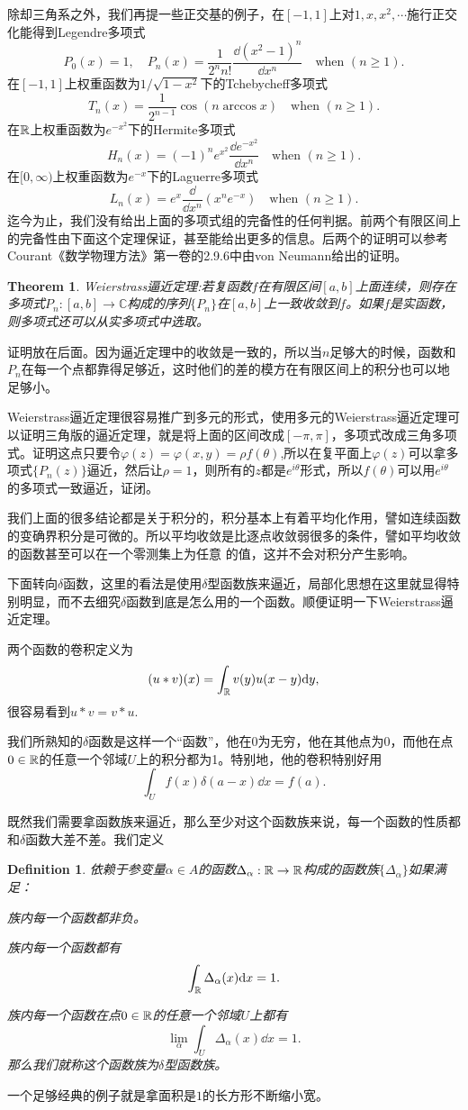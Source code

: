 \documentclass[10pt]{book}
\theoremstyle{plain}%
\newtheorem{defi}{Definition}[chapter]%
\newtheorem{theo}{Theorem}[chapter]%
\newcommand{\cc}{\mathbb{C}}
\begin{document}
除却三角系之外，我们再提一些正交基的例子，在$[-1,1]$上对$1,x,x^2,\cdots$施行正交化能得到Legendre多项式
\[
P_0(x)=1,\quad P_n(x)=\frac{1}{2^n n!}\frac{\dd (x^2-1)^n}{\dd x^n}\quad\text{when} \,\,(n\geq 1).
\]
在$[-1,1]$上权重函数为$1/\sqrt{1-x^2}$下的Tchebycheff多项式
\[
T_n(x)=\frac{1}{2^{n-1}}\cos (n \arccos x)\quad\text{when} \,\,(n\geq 1).
\]
在$\mathbb{R}$上权重函数为$e^{-x^2}$下的Hermite多项式
\[
H_n(x)=(-1)^n e^{x^2} \frac{\dd e^{-x^2}}{\dd x^n}\quad\text{when} \,\,(n\geq 1).
\]
在$[0,\infty)$上权重函数为$e^{-x}$下的Laguerre多项式
\[
L_n(x)=e^{x} \frac{\dd}{\dd x^n}(x^ne^{-x})\quad\text{when} \,\,(n\geq 1).
\]
迄今为止，我们没有给出上面的多项式组的完备性的任何判据。前两个有限区间上的完备性由下面这个定理保证，甚至能给出更多的信息。后两个的证明可以参考Courant《数学物理方法》第一卷的2.9.6中由von Neumann给出的证明。
\begin{theo}
Weierstrass逼近定理:若复函数$f$在有限区间$[a,b]$上面连续，则存在多项式$P_n:[a,b]\to \cc$构成的序列$\{P_n\}$在$[a,b]$上一致收敛到$f$。如果$f$是实函数，则多项式还可以从实多项式中选取。
\end{theo}
证明放在后面。因为逼近定理中的收敛是一致的，所以当$n$足够大的时候，函数和$P_n$在每一个点都靠得足够近，这时他们的差的模方在有限区间上的积分也可以地足够小。

Weierstrass逼近定理很容易推广到多元的形式，使用多元的Weierstrass逼近定理可以证明三角版的逼近定理，就是将上面的区间改成$[-\pi,\pi]$，多项式改成三角多项式。证明这点只要令$\varphi(z)=\varphi(x,y)=\rho f(\theta)$,所以在复平面上$\varphi(z)$可以拿多项式$\{P_n(z)\}$逼近，然后让$\rho=1$，则所有的$z$都是$e^{i\theta}$形式，所以$f(\theta)$可以用$e^{i\theta}$的多项式一致逼近，证闭。

我们上面的很多结论都是关于积分的，积分基本上有着平均化作用，譬如连续函数的变确界积分是可微的。所以平均收敛是比逐点收敛弱很多的条件，譬如平均收敛的函数甚至可以在一个零测集上为任意
的值，这并不会对积分产生影响。

下面转向$\delta$函数，这里的看法是使用$\delta$型函数族来逼近，局部化思想在这里就显得特别明显，而不去细究$\delta$函数到底是怎么用的一个函数。顺便证明一下Weierstrass逼近定理。

两个函数的卷积定义为
\[
	(u*v)(x)=\int_{\mathbb{R}} v(y)u(x-y)\mathrm{d} y,
\]
很容易看到$u*v=v*u$.

我们所熟知的$\delta$函数是这样一个“函数”，他在0为无穷，他在其他点为0，而他在点$0\in \mathbb{R}$的任意一个邻域$U$上的积分都为1。特别地，他的卷积特别好用
\[
\int_U f(x)\delta(a-x) \dd x=f(a).
\]

既然我们需要拿函数族来逼近，那么至少对这个函数族来说，每一个函数的性质都和$\delta$函数大差不差。我们定义
\begin{defi}
依赖于参变量$\alpha\in A$的函数$\Delta_\alpha:\mathbb{R}\to \mathbb{R}$构成的函数族$\{\Delta_\alpha\}$如果满足：

族内每一个函数都非负。

族内每一个函数都有
\[
\int_{\mathbb{R}} \Delta_\alpha(x) \mathrm{d} x=1.
\]

族内每一个函数在点$0\in \mathbb{R}$的任意一个邻域$U$上都有
\[
\lim_{\alpha} \int_U \Delta_\alpha(x) \dd x=1.
\]
那么我们就称这个函数族为$\delta$型函数族。
\end{defi}
一个足够经典的例子就是拿面积是$1$的长方形不断缩小宽。
\end{document}
